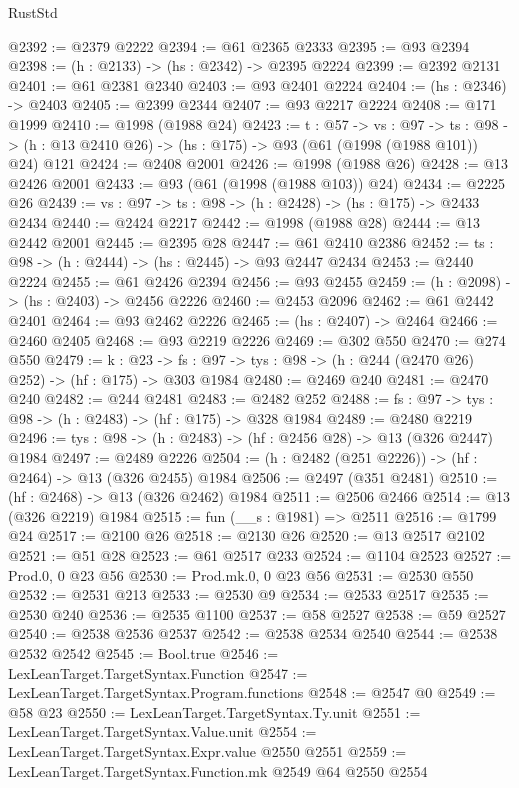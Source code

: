 \begin{lexlean}{RustStd}
\begin{coremodule}
@2392 := @2379 @2222
@2394 := @61 @2365 @2333
@2395 := @93 @2394
@2398 := (h : @2133) -> (hs : @2342) -> @2395 @2224
@2399 := @2392 @2131
@2401 := @61 @2381 @2340
@2403 := @93 @2401 @2224
@2404 := (hs : @2346) -> @2403
@2405 := @2399 @2344
@2407 := @93 @2217 @2224
@2408 := @171 @1999
@2410 := @1998 (@1988 @24)
@2423 := {t : @57} ->
  {vs : @97} ->
  {ts : @98} -> (h : @13 @2410 @26) -> (hs : @175) -> @93 (@61 (@1998 (@1988 @101)) @24) @121
@2424 := @2408 @2001
@2426 := @1998 (@1988 @26)
@2428 := @13 @2426 @2001
@2433 := @93 (@61 (@1998 (@1988 @103)) @24)
@2434 := @2225 @26
@2439 := {vs : @97} -> {ts : @98} -> (h : @2428) -> (hs : @175) -> @2433 @2434
@2440 := @2424 @2217
@2442 := @1998 (@1988 @28)
@2444 := @13 @2442 @2001
@2445 := @2395 @28
@2447 := @61 @2410 @2386
@2452 := {ts : @98} -> (h : @2444) -> (hs : @2445) -> @93 @2447 @2434
@2453 := @2440 @2224
@2455 := @61 @2426 @2394
@2456 := @93 @2455
@2459 := (h : @2098) -> (hs : @2403) -> @2456 @2226
@2460 := @2453 @2096
@2462 := @61 @2442 @2401
@2464 := @93 @2462 @2226
@2465 := (hs : @2407) -> @2464
@2466 := @2460 @2405
@2468 := @93 @2219 @2226
@2469 := @302 @550
@2470 := @274 @550
@2479 := {k : @23} ->
  {fs : @97} -> {tys : @98} -> (h : @244 (@2470 @26) @252) -> (hf : @175) -> @303 @1984
@2480 := @2469 @240
@2481 := @2470 @240
@2482 := @244 @2481
@2483 := @2482 @252
@2488 := {fs : @97} -> {tys : @98} -> (h : @2483) -> (hf : @175) -> @328 @1984
@2489 := @2480 @2219
@2496 := {tys : @98} -> (h : @2483) -> (hf : @2456 @28) -> @13 (@326 @2447) @1984
@2497 := @2489 @2226
@2504 := (h : @2482 (@251 @2226)) -> (hf : @2464) -> @13 (@326 @2455) @1984
@2506 := @2497 (@351 @2481)
@2510 := (hf : @2468) -> @13 (@326 @2462) @1984
@2511 := @2506 @2466
@2514 := @13 (@326 @2219) @1984
@2515 := fun (__s : @1981) => @2511
@2516 := @1799 @24
@2517 := @2100 @26
@2518 := @2130 @26
@2520 := @13 @2517 @2102
@2521 := @51 @28
@2523 := @61 @2517 @233
@2524 := @1104 @2523
@2527 := Prod.{0, 0} @23 @56
@2530 := Prod.mk.{0, 0} @23 @56
@2531 := @2530 @550
@2532 := @2531 @213
@2533 := @2530 @9
@2534 := @2533 @2517
@2535 := @2530 @240
@2536 := @2535 @1100
@2537 := @58 @2527
@2538 := @59 @2527
@2540 := @2538 @2536 @2537
@2542 := @2538 @2534 @2540
@2544 := @2538 @2532 @2542
@2545 := Bool.true
@2546 := LexLeanTarget.TargetSyntax.Function
@2547 := LexLeanTarget.TargetSyntax.Program.functions
@2548 := @2547 @0
@2549 := @58 @23
@2550 := LexLeanTarget.TargetSyntax.Ty.unit
@2551 := LexLeanTarget.TargetSyntax.Value.unit
@2554 := LexLeanTarget.TargetSyntax.Expr.value @2550 @2551
@2559 := LexLeanTarget.TargetSyntax.Function.mk @2549 @64 @2550 @2554

\end{coremodule}
\end{lexlean}
